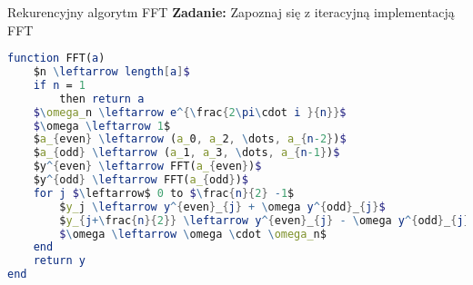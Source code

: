 \begin{frame}[fragile]{Rekurencyjny algorytm FFT}
\textbf{Zadanie:} Zapoznaj się z iteracyjną implementacją FFT
\begin{lstlisting}[language=Mathematica, mathescape]
function FFT(a)
	$n \leftarrow length[a]$
	if n = 1 
		then return a
	$\omega_n \leftarrow e^{\frac{2\pi\cdot i }{n}}$
	$\omega \leftarrow 1$
	$a_{even} \leftarrow (a_0, a_2, \dots, a_{n-2})$
	$a_{odd} \leftarrow (a_1, a_3, \dots, a_{n-1})$
	$y^{even} \leftarrow FFT(a_{even})$
	$y^{odd} \leftarrow FFT(a_{odd})$
	for j $\leftarrow$ 0 to $\frac{n}{2} -1$
		$y_j \leftarrow y^{even}_{j} + \omega y^{odd}_{j}$
		$y_{j+\frac{n}{2}} \leftarrow y^{even}_{j} - \omega y^{odd}_{j} $
		$\omega \leftarrow \omega \cdot \omega_n$
	end	
	return y
end
\end{lstlisting}

\end{frame}